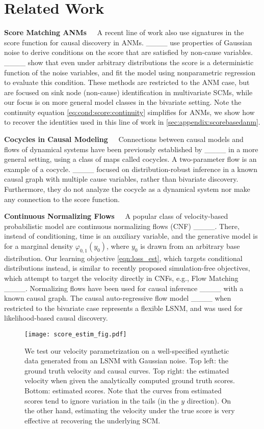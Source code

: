 \section{Related Work}
\label{sec:related}

\textbf{Score Matching ANMs\ \ } A recent line of work also use signatures in the score function for causal discovery in ANMs. ____ use properties of Gaussian noise to derive conditions on the score that are satisfied by non-cause variables. ____ show that even under arbitrary distributions the score is a deterministic function of the noise variables, and fit the model using nonparametric regression to evaluate this condition. These methods are restricted to the ANM case, but are focused on sink node (non-cause) identification in multivariate SCMs, while our focus is on more general model classes in the bivariate setting. Note the continuity equation \eqref{eq:cond:score:continuity} simplifies for ANMs, we show how to recover the identities used in this line of work in \cref{sec:appendix:scorebasedanm}.

\textbf{Cocycles in Causal Modeling\ \ }
Connections between causal models and flows of dynamical systems have been previously established by ____ in a more general setting, using a class of maps called cocycles. A two-parameter flow is an example of a cocycle. ____ focused on distribution-robust inference in a known causal graph with multiple cause variables, rather than bivariate discovery. Furthermore, they do not analyze the cocycle as a dynamical system nor make any connection to the score function.  

\textbf{Continuous Normalizing Flows\ \ } A popular class of velocity-based probabilistic model are  continuous normalizing flows (CNF) ____. There, instead of conditioning, time is an auxiliary variable, and the generative model is for a marginal density $\varphi_{0,1}(y_0)$, where $y_0$ is drawn from an arbitrary base distribution. Our learning objective \eqref{eqn:loss_est}, which targets conditional distributions instead, is similar to recently proposed simulation-free objectives, which attempt to target the velocity directly in CNFs, e.g., Flow Matching ____. Normalizing flows have been used for causal inference ____ with a known causal graph. The causal auto-regressive flow model ____ when restricted to the bivariate case represents a flexible LSNM, and was used for likelihood-based causal discovery.


\begin{figure}
    \centering
    \texttt{[image: score\_estim\_fig.pdf]}
    \vspace{-20pt}
    \caption{We test our velocity parametrization on a well-specified synthetic data generated from an LSNM with Gaussian noise. Top left: the ground truth velocity and causal curves. Top right: the estimated velocity when given the analytically computed ground truth scores. Bottom: estimated scores. Note that the curves from estimated scores tend to ignore variation in the tails (in the $y$ direction). On the other hand, estimating the velocity under the true score is very effective at recovering the underlying SCM.}
    \label{fig:score}
    \vspace{-5pt}
\end{figure}